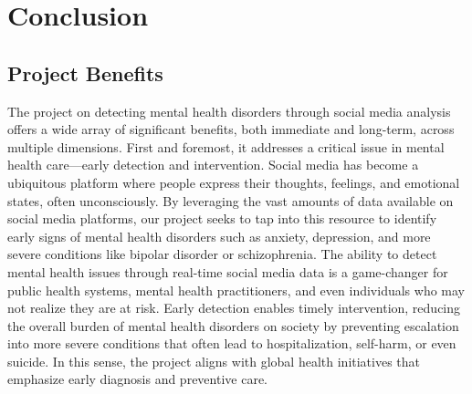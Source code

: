 
\section{Conclusion}

\subsection{Project Benefits}
\noindent
The project on detecting mental health disorders through social media analysis offers a wide array of significant benefits, both immediate and long-term, across multiple dimensions. First and foremost, it addresses a critical issue in mental health care—early detection and intervention. Social media has become a ubiquitous platform where people express their thoughts, feelings, and emotional states, often unconsciously. By leveraging the vast amounts of data available on social media platforms, our project seeks to tap into this resource to identify early signs of mental health disorders such as anxiety, depression, and more severe conditions like bipolar disorder or schizophrenia. The ability to detect mental health issues through real-time social media data is a game-changer for public health systems, mental health practitioners, and even individuals who may not realize they are at risk. Early detection enables timely intervention, reducing the overall burden of mental health disorders on society by preventing escalation into more severe conditions that often lead to hospitalization, self-harm, or even suicide. In this sense, the project aligns with global health initiatives that emphasize early diagnosis and preventive care. 

